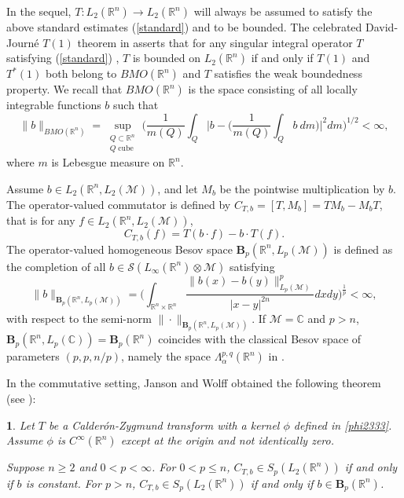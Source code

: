\documentclass[oneside,english,a4wide]{amsart}
\numberwithin{equation}{section}
\numberwithin{figure}{section}
\theoremstyle{plain}
\newtheorem{thm}{\protect\theoremname}[section]
\theoremstyle{plain}
\theoremstyle{definition}
\theoremstyle{plain}
\theoremstyle{remark}
\theoremstyle{definition}
\theoremstyle{remark}
\theoremstyle{definition}
\providecommand{\theoremname}{Theorem}
\newcommand{\M}{{\mathcal M}}
\newcommand{\8}{\infty}
\begin{document}
In the sequel,  $T:L_2(\mathbb{R}^n)\to L_2(\mathbb{R}^n)$ will always be assumed to satisfy the above standard estimates (\ref{standard}) and to be bounded. The celebrated David-Journé $T(1)$ theorem in \cite{DaJou} asserts that for any singular integral operator $T$ satisfying (\ref{standard}) , $T$ is bounded on $L_2(\mathbb{R}^n)$ if and only if $T(1)$ and $T^*(1)$ both belong to $BMO(\mathbb{R}^n)$ and $T$ satisfies the weak boundedness property. We recall that $BMO(\mathbb{R}^n)$ is the space consisting of all locally integrable functions $b$ such that
$$  \|b\|_{BMO(\mathbb{R}^n)}= \sup _{\substack{Q \subset \mathbb{R}^n \\ Q \operatorname{cube}}} \bigg(\frac{1}{m(Q)} \int_Q\Big|b-\big(\frac{1}{m(Q)} \int_Q b\ d m\big)\Big|^2 d m\bigg)^{1/2}<\infty, $$
where $m$ is Lebesgue measure on $\mathbb{R}^n$.

Assume $b\in L_2(\mathbb{R}^n, L_2(\M))$, and let $M_b$ be the pointwise multiplication by $b$. The operator-valued commutator is defined by $C_{T, b}=[T, M_b]=T M_b - M_b T$, that is for any $f\in L_2(\mathbb{R}^n, L_2(\M))$,
$$  C_{T, b}(f)=T(b\cdot f)-b\cdot T(f).  $$
The operator-valued homogeneous Besov space $\pmb{B}_p(\mathbb{R}^n, L_p(\mathcal{M}))$ is defined as the completion of all $b\in \mathcal{S}(L_\8(\mathbb{R}^n)\otimes \M)$ satisfying
\begin{equation}\label{funeq}
	\|b\|_{\pmb{B}_p(\mathbb{R}^n, L_p(\mathcal{M}))}=	\bigg(\int_{\mathbb{R}^n\times\mathbb{R}^n}\frac{\|b(x)-b(y)\|_{L_p(\mathcal{M})}^p}{|x-y|^{2n}}dxdy\bigg)^{\frac{1}{p}}<\infty,
\end{equation}  
with respect to the semi-norm  $\|\cdot \|_{\pmb{B}_p(\mathbb{R}^n, L_p(\mathcal{M}))}$. If $\mathcal{M}=\mathbb{C}$ and $p>n$, $\pmb{B}_p(\mathbb{R}^n, L_p(\mathbb{C}))=\pmb{B}_p(\mathbb{R}^n)$ coincides with the classical Besov space of parameters $(p,p,n/p)$, namely the space $\Lambda_\alpha^{p,q}(\mathbb{R}^n)$ in \cite[Chapter V, \S 5]{ST}.

In the commutative setting, Janson and Wolff obtained the following theorem (see {\cite[Theorem 1]{JW}}):
 \begin{thm}\label{thm1.5}
	Let $T$ be a Calder\'{o}n-Zygmund transform with a kernel $\phi$ defined in \eqref{phi2333}. Assume $\phi$ is $C^{\infty}(\mathbb{R}^n)$ except at the origin and not identically zero. 
	
	Suppose $n \geq 2$ and $0<p<\infty$. For $0<p\leq n$, $ C_{T, b}\in S_p(L_2(\mathbb{R}^n))$ if and only if $b$ is constant. For $p>n$, $ C_{T, b}\in S_p(L_2(\mathbb{R}^n))$ if and only if $b\in \pmb{B}_p(\mathbb{R}^n)$.
\end{thm}
\end{document}
